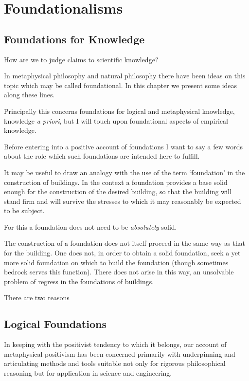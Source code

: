 
\chapter{Foundationalisms}\label{Foundationalisms}

\section{Foundations for Knowledge}

How are we to judge claims to scientific knowledge?

In metaphysical philosophy and natural philosophy there have been
ideas on this topic which may be called foundational.
In this chapter we present some ideas along these lines.

Principally this concerns foundations for logical and metaphysical
knowledge, knowledge \emph{a priori}, but I will touch upon
foundational aspects of empirical knowledge.

Before entering into a positive account of foundations I want to say a
few words about the role which such foundations are intended here to
fulfill.

It may be useful to draw an analogy with the use of the term
`foundation' in the construction of buildings.
In the context a foundation provides a base solid enough for the
construction of the desired building, so that the building will
stand firm and will survive the stresses to which it may reasonably be
expected to be subject.

For this a foundation does not need to be \emph{absolutely} solid.

The construction of a foundation does not itself proceed in the same
way as that for the building.
One does not, in order to obtain a solid foundation, seek a yet more
solid foundation on which to build the foundation (though sometimes
bedrock serves this function).
There does not arise in this way, an unsolvable problem of regress in
the foundations of buildings.

There are two reasons


\section{Logical Foundations}

In keeping with the positivist tendency to which it belongs, our
account of metaphysical positivism has been concerned primarily with
underpinning and articulating methods and tools suitable not only for
rigorous philosophical reasoning but for application in science and
engineering.

